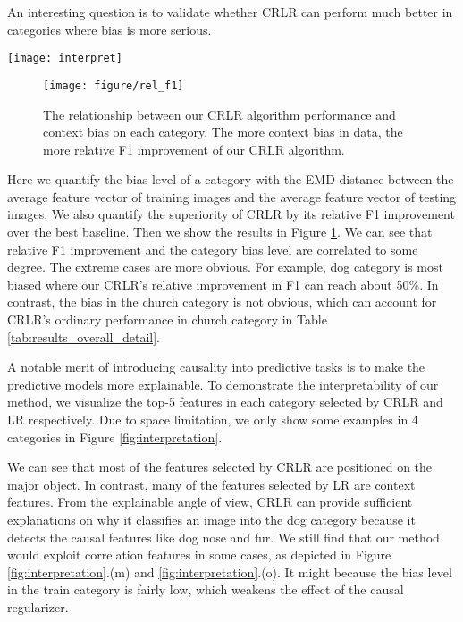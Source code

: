 \documentclass[sigconf]{acmart}
\begin{document}
An interesting question is to validate whether CRLR can perform much better in categories where bias is more serious. 

\begin{figure*}[tbp]
\centering
\texttt{[image: interpret]}
\vspace{-0.1in}
\caption{Top 5 features selected by CRLR and Logistic Regression, the red boxes indicate the features that CRLR selects and the green boxes indicate the features that Logistic Regression selects. Note that each feature represents a visual word and may correspond to multiple bounding boxes, so the number of red and green boxes may not be equal.}
\label{fig:interpretation}
\end{figure*}\begin{figure}[h]
\texttt{[image: figure/rel\_f1]}
\caption{The relationship between our CRLR algorithm performance and context bias on each category. The more context bias in data, the more relative F1 improvement of our CRLR algorithm.}
\label{fig:bias_relation}
\end{figure}
Here we quantify the bias level of a category with the EMD distance between the average feature vector of training images and the average feature vector of testing images. 
We also quantify the superiority of CRLR by its relative F1 improvement over the best baseline. 
Then we show the results in Figure \ref{fig:bias_relation}. 
We can see that relative F1 improvement and the category bias level are correlated to some degree. 
The extreme cases are more obvious. 
For example, dog category is most biased where our CRLR's relative improvement in F1 can reach about 50\%. 
In contrast, the bias in the church category is not obvious, which can account for CRLR's ordinary performance in church category in Table \ref{tab:results_overall_detail}.

A notable merit of introducing causality into predictive tasks is to make the predictive models more explainable. 
To demonstrate the interpretability of our method, we visualize the top-5 features in each category selected by CRLR and LR respectively. 
Due to space limitation, we only show some examples in 4 categories in Figure \ref{fig:interpretation}.

We can see that most of the features selected by CRLR are positioned on the major object. 
In contrast, many of the features selected by LR are context features.
From the explainable angle of view, CRLR can provide sufficient explanations on why it classifies an image into the dog category because it detects the causal features like dog nose and fur. 
We still find that our method would exploit correlation features in some cases, as depicted in Figure \ref{fig:interpretation}.(m) and \ref{fig:interpretation}.(o). 
It might because the bias level in the train category is fairly low, which weakens the effect of the causal regularizer.
\end{document}
